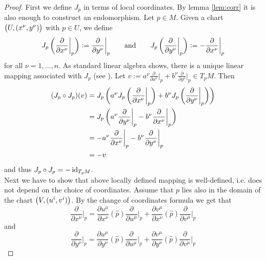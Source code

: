 \begin{proof}
First we define $J_p$ in terms of local coordinates. By lemma \ref{lem:corr} it is also enough to construct an endomorphism. Let $p \in M$. Given a chart $\del[1]{U,(x^\nu,y^\nu)}$ with $p \in U$, we define
\begin{equation*}
J_p\del[3]{\frac{\partial}{\partial x^\nu}\bigg\vert_p} := \frac{\partial}{\partial y^\nu}\bigg\vert_p \qquad \text{and} \qquad J_p\del[3]{\frac{\partial}{\partial y^\nu}\bigg\vert_p} := -\frac{\partial}{\partial x^\nu}\bigg\vert_p
\end{equation*}
\noindent for all $\nu = 1,\dots,n$. As standard linear algebra shows, there is a unique linear mapping associated with $J_p$ (see \cite[69]{hoffman:linear_algebra:1971}). Let $v := a^\nu\frac{\partial}{\partial x^\nu}\big\vert_p + b^\nu\frac{\partial}{\partial y^\nu}\big\vert_p \in T_p M$. Then
\begin{align*}
(J_p \circ J_p)(v) &=J_p\del[3]{a^\nu J_p\del[3]{\frac{\partial}{\partial x^\nu}\bigg\vert_p} + b^\nu J_p\del[3]{\frac{\partial}{\partial y^\nu}\bigg\vert_p}}\\
&= J_p\del[3]{a^\nu \frac{\partial}{\partial y^\nu}\bigg\vert_p - b^\nu \frac{\partial}{\partial x^\nu}\bigg\vert_p}\\
&= -a^\nu \frac{\partial}{\partial x^\nu}\bigg\vert_p - b^\nu \frac{\partial}{\partial y^\nu}\bigg\vert_p\\
&= -v
\end{align*}
\noindent and thus $J_p \circ J_p = -\operatorname{id}_{T_pM}$.\\
Next we have to show that above locally defined mapping is well-defined, i.e. does not depend on the choice of coordinates. Assume that $p$ lies also in the domain of the chart $\del[1]{V,(u^i,v^i)}$. By the change of coordinates formula \cite[64]{lee:smooth_manifolds:2013} we get that
\begin{equation*}
\frac{\partial}{\partial x^\nu}\bigg\vert_p = \frac{\partial u^\mu}{\partial x^\nu}(\widehat{p})\frac{\partial}{\partial u^\mu}\bigg\vert_p + \frac{\partial v^\mu}{\partial x^\nu}(\widehat{p})\frac{\partial}{\partial v^\mu}\bigg\vert_p
\end{equation*}
\noindent and
\begin{equation*}
\frac{\partial}{\partial y^\nu}\bigg\vert_p = \frac{\partial u^\mu}{\partial y^\nu}(\widehat{p})\frac{\partial}{\partial u^\mu}\bigg\vert_p + \frac{\partial v^\mu}{\partial y^\nu}(\widehat{p})\frac{\partial}{\partial v^\mu}\bigg\vert_p 
\end{equation*}

\end{proof}
